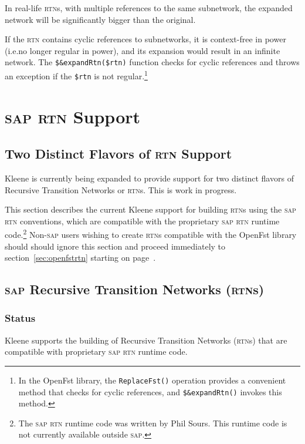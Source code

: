 \documentclass[letterpaper,12pt]{article}
\newcommand{\acro}{\textsc}
\begin{document}
\noindent
In real-life \acro{rtn}s, with multiple references to the same
subnetwork, the expanded network will be significantly bigger than the
original.  

If the \acro{rtn} contains cyclic references to subnetworks, it is
context-free in power (i.e.\@ no longer regular in power), and its
expansion would result in an infinite network.  The
\verb!$&expandRtn($rtn)! function checks for cyclic references and throws
an exception if the \verb!$rtn! is not regular.\footnote{In the OpenFst
library, the \verb!ReplaceFst()! operation provides a convenient method
that checks for cyclic references, and \verb!$&expandRtn()! invokes this
method.}

\section{\acro{sap} \acro{rtn} Support}

\label{sec:saprtn}

\subsection{Two Distinct Flavors of \acro{rtn} Support}

Kleene is currently being expanded to provide support for two distinct
flavors of Recursive Transition Networks or \acro{rtn}s.  This is work in
progress.

This section describes the current Kleene support for building
\acro{rtn}s using the \acro{sap} \acro{rtn} conventions, which are
compatible with the proprietary \acro{sap} \acro{rtn} runtime
code.\footnote{The \acro{sap} \acro{rtn} runtime code was written by Phil
Sours.  This runtime code is not currently available outside \acro{sap}.}
Non-\acro{sap} users wishing to create \acro{rtn}s compatible with the
OpenFst library should should ignore this section and proceed immediately
to section~\ref{sec:openfstrtn} starting on
page~\pageref{sec:openfstrtn}.

\subsection{\acro{sap} Recursive Transition Networks (\acro{rtn}s)}

\subsubsection{Status}

Kleene supports the building of Recursive Transition Networks
(\acro{rtn}s) that are compatible with proprietary \acro{sap} \acro{rtn}
runtime code.
\end{document}
